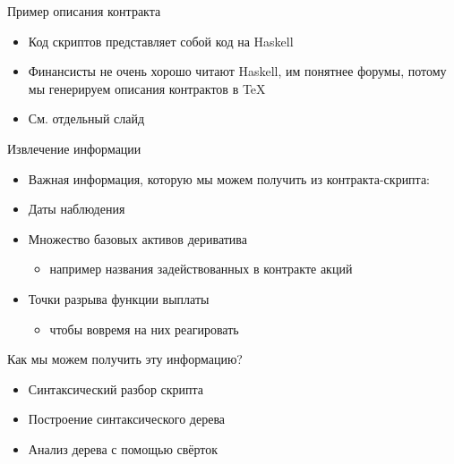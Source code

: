 \documentclass{beamer}
\begin{document}
\begin{frame}{Пример описания контракта}

\begin{itemize}
\item
  Код скриптов представляет собой код на Haskell
\item
  Финансисты не очень хорошо читают Haskell, им понятнее форумы, потому
  мы генерируем описания контрактов в TeX
\item
  См. отдельный слайд
\end{itemize}
\end{frame}\begin{frame}{Извлечение информации}

\begin{itemize}
\item
  Важная информация, которую мы можем получить из контракта-скрипта:
\item
  Даты наблюдения
\item
  Множество базовых активов дериватива

  \begin{itemize}
  \item
    например названия задействованных в контракте акций
  \end{itemize}
\item
  Точки разрыва функции выплаты

  \begin{itemize}
  \item
    чтобы вовремя на них реагировать
  \end{itemize}
\end{itemize}
\end{frame}\begin{frame}{Как мы можем получить эту информацию?}

\begin{itemize}
\item
  Синтаксический разбор скрипта
\item
  Построение синтаксического дерева
\item
  Анализ дерева с помощью свёрток
\end{itemize}
\end{frame}
\end{document}
